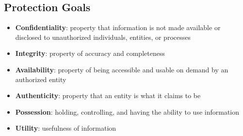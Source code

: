 \documentclass[12pt,A4]{extarticle}
\newcommand{\highlight}[1]{\textcolor{highlightColor}{\textbf{#1}}}
\begin{document}
\subsection{Protection Goals}
\begin{itemize}
  \item{\highlight{Confidentiality}: property that information is not made available or disclosed to unauthorized individuals, entities, or processes }
  \item{\highlight{Integrity}: property of accuracy and completeness }
  \item{\highlight{Availability}: property of being accessible and usable on demand by an authorized entity }
  \item{\highlight{Authenticity}: property that an entity is what it claims to be }
  \item{\highlight{Possession}: holding, controlling, and having the ability to use information \cite{TowardANewFrameworkForInformationSecurity}}
  \item{\highlight{Utility}: usefulness of information \cite{TowardANewFrameworkForInformationSecurity}}
\end{itemize}

\newpage


\end{document}
